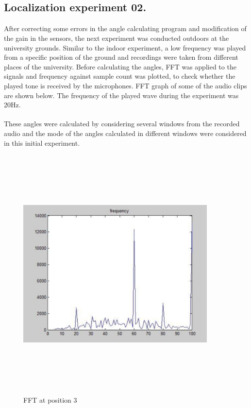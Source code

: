 \documentclass[12pt]{article}
\numberwithin{figure}{section}
\numberwithin{table}{section}
\begin{document}
\subsection{Localization experiment 02.}

\paragraph{}
After correcting some errors in the angle calculating program and modification of the gain in the sensors, the next experiment was conducted outdoors at the university grounds.  Similar to the indoor experiment, a low frequency was played from a specific position of the ground and recordings were taken from different places of the university.  Before calculating the angles, FFT was applied to the signals and frequency against sample count was plotted, to check whether the played tone is received by the microphones. FFT graph of some of the audio clips are shown below. The frequency of the played wave during the experiment was 20Hz.


\paragraph{}
These angles were calculated by considering several windows from the recorded audio and the mode of the angles calculated in different windows were considered in this initial experiment.

\begin{figure}[H]
\centering

\includegraphics[width=10cm,height=13cm,keepaspectratio]{position3.png}
\caption{FFT at position 3}
\label{d:p3}
\end{figure}
\end{document}
